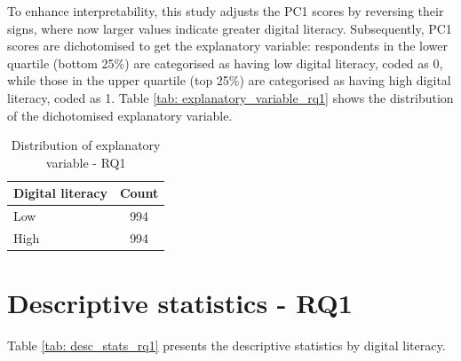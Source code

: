 To enhance interpretability, this study adjusts the PC1 scores by reversing their signs, where now larger values indicate greater digital literacy. Subsequently, PC1 scores are dichotomised to get the explanatory variable: respondents in the lower quartile (bottom 25\%) are categorised as having low digital literacy, coded as 0, while those in the upper quartile (top 25\%) are categorised as having high digital literacy, coded as 1. Table \ref{tab: explanatory_variable_rq1} shows the distribution of the dichotomised explanatory variable.

\begin{table}[h!]
    \centering
    \caption{Distribution of explanatory variable - RQ1}
    \label{tab:explanatory_variable_rq1}
    \begin{tabular}{lc}
        \toprule
        Digital literacy & Count \\
        \midrule
        Low & 994 \\
        High & 994 \\
        \bottomrule
    \end{tabular}
\end{table}

\section{Descriptive statistics - RQ1}
Table \ref{tab: desc_stats_rq1} presents the descriptive statistics by digital literacy. 

